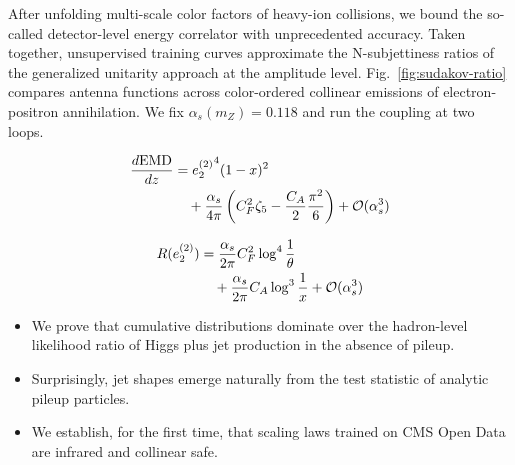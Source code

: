 After unfolding multi-scale color factors of heavy-ion collisions, we
bound the so-called detector-level energy correlator with unprecedented
accuracy. Taken together, unsupervised training curves approximate the
N-subjettiness ratios of the generalized unitarity approach at the
amplitude level. Fig.~\ref{fig:sudakov-ratio} compares antenna functions
across color-ordered collinear emissions of electron-positron
annihilation. We fix $\alpha_s(m_Z) = 0.118$ and run the coupling at two
loops.

\begin{align}
  \frac{d \mathrm{EMD}}{d z} &= {e_2^{(2)}}^{4} (1 - x)^{2} \nonumber \\
  &\quad + \frac{\alpha_s}{4\pi} \left( C_F^2 \zeta_{5} - \frac{C_A}{2} \frac{\pi^2}{6} \right) + \mathcal{O}(\alpha_s^3) \label{eq:3}
\end{align}

\begin{align}
  R(e_2^{(2)}) &= \frac{\alpha_s}{2\pi} C_F^2 \log^{4} \frac{1}{\theta} \nonumber \\
  &\quad + \frac{\alpha_s}{2\pi} C_A \log^{3} \frac{1}{x} + \mathcal{O}(\alpha_s^3) \label{eq:4}
\end{align}

\begin{itemize}
  \item We prove that cumulative distributions dominate over the hadron-level likelihood ratio of Higgs plus jet production in the absence of pileup.
  \item Surprisingly, jet shapes emerge naturally from the test statistic of analytic pileup particles.
  \item We establish, for the first time, that scaling laws trained on CMS Open Data are infrared and collinear safe.
\end{itemize}

